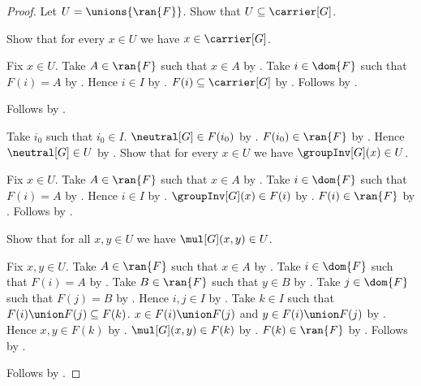 \begin{proof}
    Let $U=\unions{\ran{F}}$.
    Show that $U\subseteq\carrier[G]$.
    \begin{subproof}
        Show that for every $x\in U$ we have $x\in\carrier[G]$.
        \begin{subproof}
            Fix $x\in U$.
            Take $A\in\ran{F}$ such that $x\in A$ by .
            Take $i\in\dom{F}$ such that $F(i)=A$ by
                .
            Hence $i\in I$ by .
            $F(i)\subseteq\carrier[G]$ by .
            Follows by .
        \end{subproof}
        Follows by .
    \end{subproof}
    Take $i_0$ such that $i_0\in I$.
    $\neutral[G]\in F(i_0)$ by .
    $F(i_0)\in\ran{F}$ by .
    Hence $\neutral[G]\in U$ by .
    Show that for every $x\in U$ we have $\groupInv[G](x)\in U$.
    \begin{subproof}
        Fix $x\in U$.
        Take $A\in\ran{F}$ such that $x\in A$ by .
        Take $i\in\dom{F}$ such that $F(i)=A$ by
            .
        Hence $i\in I$ by .
        $\groupInv[G](x)\in F(i)$ by .
        $F(i)\in\ran{F}$ by .
        Follows by .
    \end{subproof}
    Show that for all $x,y\in U$ we have $\mul[G](x,y)\in U$.
    \begin{subproof}
        Fix $x,y\in U$.
        Take $A\in\ran{F}$ such that $x\in A$ by .
        Take $i\in\dom{F}$ such that $F(i)=A$ by
            .
        Take $B\in\ran{F}$ such that $y\in B$ by .
        Take $j\in\dom{F}$ such that $F(j)=B$ by
            .
        Hence $i,j\in I$ by .
        Take $k\in I$ such that $F(i)\union F(j)\subseteq F(k)$.
        $x\in F(i)\union F(j)$ and $y\in F(i)\union F(j)$ by
            .
        Hence $x,y\in F(k)$ by .
        $\mul[G](x,y)\in F(k)$ by .
        $F(k)\in\ran{F}$ by
            .
        Follows by .
    \end{subproof}
    Follows by .
\end{proof}

